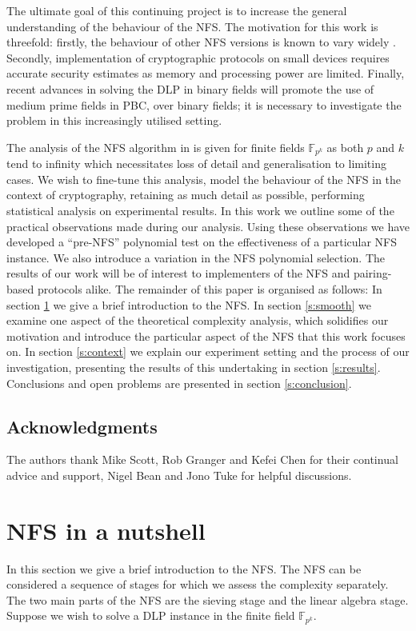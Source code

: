 \documentclass[a4paper, 10pt, envcountsect, runningheads]{article}
\newcommand{\F}{{\mathbb F}}
\numberwithin{figure}{section}
\numberwithin{equation}{section}
\begin{document}
The ultimate goal of this continuing project is to increase the general understanding of the behaviour of the NFS. The motivation for this work is threefold: firstly, the behaviour of other NFS versions is known to vary widely \cite{zajac,dan_predicting_nfs}. Secondly, implementation of cryptographic protocols on small devices requires accurate security estimates as memory and processing power are limited. Finally, recent advances in solving the DLP in binary fields \cite{FFS_rob, FFS_antoine, joux_imporved} will promote the use of medium prime fields in PBC, over binary fields; it is necessary to investigate the problem in this increasingly utilised setting.


The analysis of the NFS algorithm in \cite{joux-lercier-smart-vercauteren06} is given for finite fields $\F_{p^k}$ as both $p$ and $k$ tend to infinity which necessitates loss of detail and generalisation to limiting cases. We wish to fine-tune this analysis, model the behaviour of the NFS in the context of  cryptography, retaining as much detail as possible, performing statistical analysis on experimental results. In this work we outline some of the practical observations made during our analysis. Using these observations we have developed a ``pre-NFS'' polynomial test on the effectiveness of a particular NFS instance. We also introduce a variation in the NFS polynomial selection. The results of our work will be of interest to implementers of the NFS and pairing-based protocols alike. 
The remainder of this paper is organised as follows: In section \ref{s:nfs} we give a brief introduction to the NFS. In section \ref{s:smooth} we examine one aspect of the theoretical complexity analysis, which solidifies our motivation and introduce the particular aspect of the NFS that this work focuses on. In section \ref{s:context} we explain our experiment setting and the process of our investigation, presenting the results of this undertaking in section \ref{s:results}. Conclusions and open problems are presented in section \ref{s:conclusion}.
\subsection*{Acknowledgments}
The authors thank Mike Scott, Rob Granger and Kefei Chen for their continual advice and support, Nigel Bean and Jono Tuke for helpful discussions.

\section{NFS in a nutshell} 
\label{s:nfs}
In this section we give a brief introduction to the NFS. The NFS can be considered a sequence of stages for which we assess the complexity separately. The two main parts of the NFS are the sieving stage and the linear algebra stage. Suppose we wish to solve a DLP instance in the finite field $\F_{p^k}.$
\end{document}

